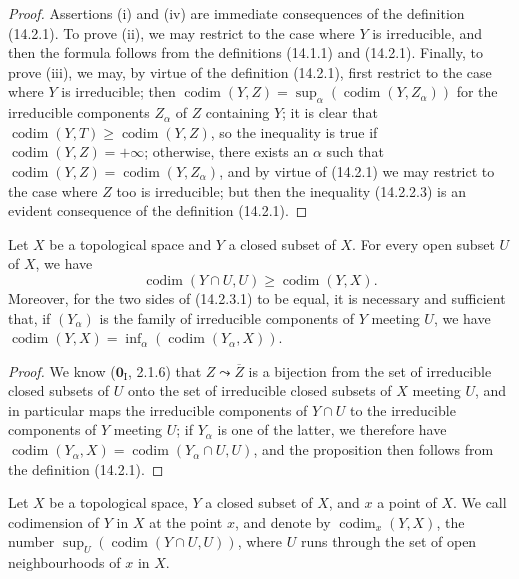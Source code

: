 \begin{proof}
Assertions (i) and (iv) are immediate consequences of the definition
(14.2.1). To prove (ii), we may restrict to the case where $Y$ is
irreducible, and then the formula follows from the definitions (14.1.1) and
(14.2.1). Finally, to prove (iii), we may, by virtue of the definition
(14.2.1), first restrict to the case where $Y$ is irreducible; then
$\operatorname{codim}(Y,Z)=
\sup_\alpha(\operatorname{codim}(Y,Z_\alpha))$ for the irreducible
components $Z_\alpha$ of $Z$ containing $Y$; it is clear that
$\operatorname{codim}(Y,T)\geq\operatorname{codim}(Y,Z)$, so the inequality
is true if $\operatorname{codim}(Y,Z)=+\infty$; otherwise, there exists an
$\alpha$ such that
$\operatorname{codim}(Y,Z)=\operatorname{codim}(Y,Z_\alpha)$, and by virtue of
(14.2.1) we may restrict to the case where $Z$ too is irreducible; but
then the inequality (14.2.2.3) is an evident consequence of the definition
(14.2.1).
\end{proof}

\begin{proposition}[14.2.3]
\label{0.14.2.3}
Let $X$ be a topological space and $Y$ a closed subset of $X$. For every
open subset $U$ of $X$, we have
\[
  \operatorname{codim}(Y\cap U,U)\geq\operatorname{codim}(Y,X).
  \tag{14.2.3.1}\label{0.14.2.3.1}
\]
Moreover, for the two sides of \textup{(14.2.3.1)} to be equal, it is necessary and
sufficient that, if $(Y_\alpha)$ is the family of irreducible components of
$Y$ meeting $U$, we have
$\operatorname{codim}(Y,X)=
\inf_\alpha(\operatorname{codim}(Y_\alpha,X))$.
\end{proposition}

\begin{proof}
We know ($\mathbf{0}_{\mathrm I}$, 2.1.6) that $Z\leadsto\overline Z$ is a bijection
from the set of irreducible closed subsets of $U$ onto the set of
irreducible closed subsets of $X$ meeting $U$, and in particular maps
the irreducible components of $Y\cap U$ to the irreducible components
of $Y$ meeting $U$; if $Y_\alpha$ is one of the latter, we
therefore have
$\operatorname{codim}(Y_\alpha,X)=
\operatorname{codim}(Y_\alpha\cap U,U)$, and the proposition then follows from
the definition (14.2.1).
\end{proof}

\begin{definition}[14.2.4]
\label{0.14.2.4}
Let $X$ be a topological space, $Y$ a closed subset of $X$, and $x$ a point
of $X$. We call codimension of $Y$ in $X$ at the point $x$, and denote by
$\operatorname{codim}_x(Y,X)$, the number
$\sup_U(\operatorname{codim}(Y\cap U,U))$, where $U$ runs through the set of
open neighbourhoods of $x$ in $X$.
\end{definition}

